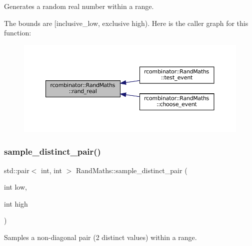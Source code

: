 Generates a random real number within a range. 

The bounds are \mbox{[}inclusive\+\_\+low, exclusive high). Here is the caller graph for this function\+:\nopagebreak
\begin{figure}[H]
\begin{center}
\leavevmode
\includegraphics[width=350pt]{classrcombinator_1_1RandMaths_aa6441baa59bff50f588c0c54e3c54140_icgraph}
\end{center}
\end{figure}
\mbox{\label{classrcombinator_1_1RandMaths_aaa759efa3059b6793100cb6b6442f26d}} 
\subsubsection{\texorpdfstring{sample\+\_\+distinct\+\_\+pair()}{sample\_distinct\_pair()}}
{\footnotesize\ttfamily std\+::pair$<$ int, int $>$ Rand\+Maths\+::sample\+\_\+distinct\+\_\+pair (\begin{DoxyParamCaption}\item[{int}]{low,  }\item[{int}]{high }\end{DoxyParamCaption})}



Samples a non-\/diagonal pair (2 distinct values) within a range. 

